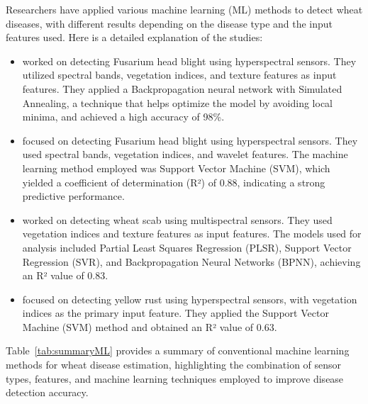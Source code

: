 Researchers have applied various machine learning (ML) methods to detect wheat diseases, with different results depending on the disease type and the input features used. Here is a detailed explanation of the studies:

\begin{itemize}
    \item \textbf{\parencite{liu2020monitoring}}  worked on detecting Fusarium head blight using hyperspectral sensors. They utilized spectral bands, vegetation indices, and texture features as input features. They applied a Backpropagation neural network with Simulated Annealing, a technique that helps optimize the model by avoiding local minima, and achieved a high accuracy of 98\%.
    \item \textbf{\parencite{Ma2021FusariumUAV}} focused on detecting Fusarium head blight using hyperspectral sensors. They used spectral bands, vegetation indices, and wavelet features. The machine learning method employed was Support Vector Machine (SVM), which yielded a coefficient of determination (R²) of 0.88, indicating a strong predictive performance.
    \item \textbf{\parencite{zhu2022using}} worked on detecting wheat scab using multispectral sensors. They used vegetation indices and texture features as input features. The models used for analysis included Partial Least Squares Regression (PLSR), Support Vector Regression (SVR), and Backpropagation Neural Networks (BPNN), achieving an R² value of 0.83.
    \item \textbf{\parencite{bohnenkamp2019in}} focused on detecting yellow rust using hyperspectral sensors, with vegetation indices as the primary input feature. They applied the Support Vector Machine (SVM) method and obtained an R² value of 0.63.
\end{itemize}

Table~\ref{tab:summaryML} provides a summary of conventional machine learning methods for wheat disease estimation, highlighting the combination of sensor types, features, and machine learning techniques employed to improve disease detection accuracy.

